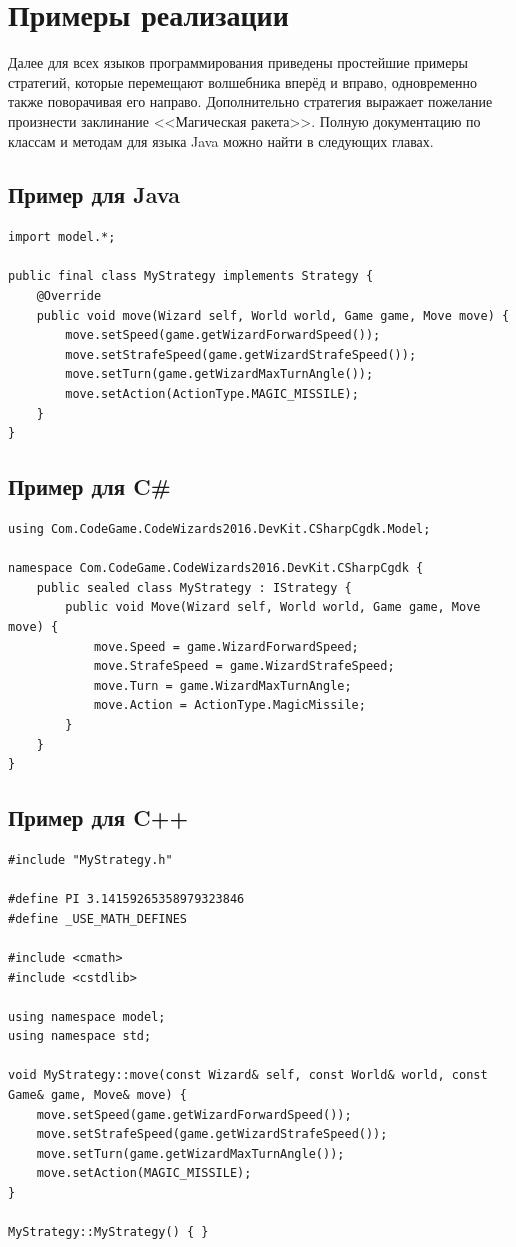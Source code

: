 \newpage
\section{Примеры реализации}

Далее для всех языков программирования приведены простейшие примеры стратегий, которые перемещают волшебника вперёд и вправо, одновременно
также поворачивая его направо. Дополнительно стратегия выражает пожелание произнести заклинание <<Магическая ракета>>. Полную документацию
по классам и методам для языка Java можно найти в следующих главах.

\subsection{Пример для Java}

\begin{verbatim}
import model.*;

public final class MyStrategy implements Strategy {
    @Override
    public void move(Wizard self, World world, Game game, Move move) {
        move.setSpeed(game.getWizardForwardSpeed());
        move.setStrafeSpeed(game.getWizardStrafeSpeed());
        move.setTurn(game.getWizardMaxTurnAngle());
        move.setAction(ActionType.MAGIC_MISSILE);
    }
}
\end{verbatim}

\subsection{Пример для C\#}

\begin{verbatim}
using Com.CodeGame.CodeWizards2016.DevKit.CSharpCgdk.Model;

namespace Com.CodeGame.CodeWizards2016.DevKit.CSharpCgdk {
    public sealed class MyStrategy : IStrategy {
        public void Move(Wizard self, World world, Game game, Move move) {
            move.Speed = game.WizardForwardSpeed;
            move.StrafeSpeed = game.WizardStrafeSpeed;
            move.Turn = game.WizardMaxTurnAngle;
            move.Action = ActionType.MagicMissile;
        }
    }
}
\end{verbatim}

\newpage
\subsection{Пример для C++}

\begin{verbatim}
#include "MyStrategy.h"

#define PI 3.14159265358979323846
#define _USE_MATH_DEFINES

#include <cmath>
#include <cstdlib>

using namespace model;
using namespace std;

void MyStrategy::move(const Wizard& self, const World& world, const Game& game, Move& move) {
    move.setSpeed(game.getWizardForwardSpeed());
    move.setStrafeSpeed(game.getWizardStrafeSpeed());
    move.setTurn(game.getWizardMaxTurnAngle());
    move.setAction(MAGIC_MISSILE);
}

MyStrategy::MyStrategy() { }
\end{verbatim}

